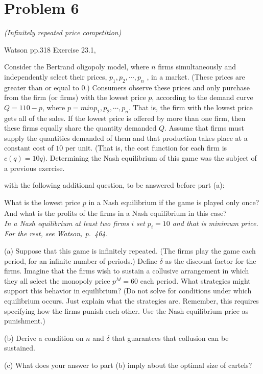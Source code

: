 \documentclass{article}
\begin{document}
\section{Problem 6} \textit{(Infinitely repeated price competition)}

Watson pp.318 Exercise 23.1, 


Consider the Bertrand oligopoly model, where $n$ firms simultaneously and independently
select their prices, $p_1 , p_2 , \cdots , p_n$ , in a market. (These prices are
greater than or equal to $0$.) Consumers observe these prices and only purchase
from the firm (or firms) with the lowest price $p$, according to the demand
curve $Q = 110 − p$, where $p = min{p_1 , p_2 , \cdots , p_n}$. That is, the firm with
the lowest price gets all of the sales. If the lowest price is offered by more than
one firm, then these firms equally share the quantity demanded $Q$. Assume
that firms must supply the quantities demanded of them and that production
takes place at a constant cost of $10$ per unit. (That is, the cost function for each
firm is $c (q) = 10q)$. Determining the Nash equilibrium of this game was the
subject of a previous exercise.






with the following additional question, to be answered before part (a):

What is the lowest price $\underline{p}$ in a Nash equilibrium if the game is played only once?
And what is the profits of the firms in a Nash equilibrium in this case? \\ \textit{In a Nash equilibrium at least two firms $i$ set $p_i = 10$ and that is minimum price. For the rest, see Watson, p.~464.}

(a) Suppose that this game is infinitely repeated. (The firms play the
game each period, for an infinite number of periods.) Define $\delta$  as the
discount factor for the firms. Imagine that the firms wish to sustain
a collusive arrangement in which they all select the monopoly price
$p^M = 60$ each period. What strategies might support this behavior in
equilibrium? (Do not solve for conditions under which equilibrium
occurs. Just explain what the strategies are. Remember, this requires
specifying how the firms punish each other. Use the Nash equilibrium
price as punishment.)

(b) Derive a condition on $n$ and $\delta$ that guarantees that collusion can be
sustained.

(c) What does your answer to part (b) imply about the optimal size of
cartels?
\end{document}
